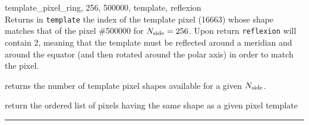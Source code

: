 \begin{example}
{
template\_pixel\_ring, 256, 500000, template, reflexion  \\
}
{
Returns in {\tt template} the index of the template pixel (16663) whose shape matches
that of the pixel \#500000 for $N_{\rm side}=256$. Upon return {\tt reflexion} will
contain 2, meaning that the template must be reflected around a meridian and
around the equator (and then rotated around the polar axis) in order to match
the pixel.
}
\end{example}
\begin{related}
  \begin{sulist}{} %
  \item[\htmlref{nside2templates}{idl:nside2ntemplates}] returns the
  number of template pixel shapes available for a given $N_{\rm side}$.
  \item[\htmlref{same\_shape\_pixels\_ring}{idl:same_shape_pixels_xxx}] 
  \item[\htmlref{same\_shape\_pixels\_nest}{idl:same_shape_pixels_xxx}] 
  return
  the ordered list of pixels having the same shape as a given pixel template
  \end{sulist}
\end{related}

\rule{\hsize}{2mm}

